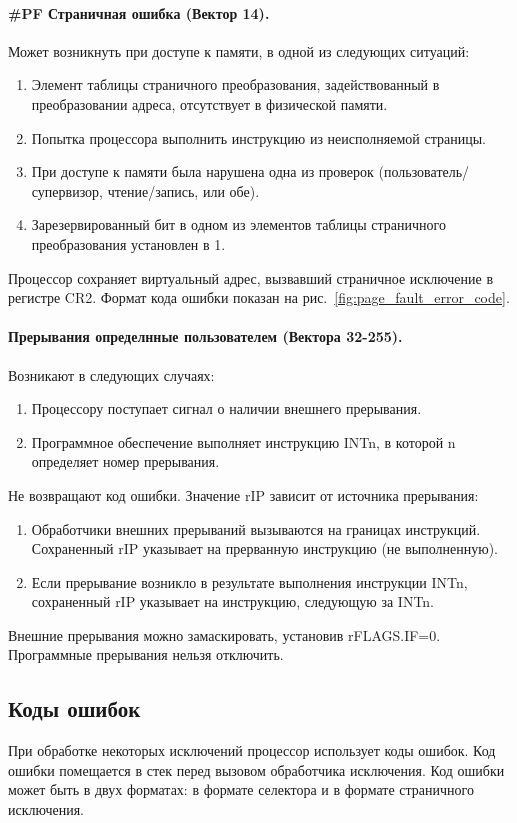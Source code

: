 \paragraph{\#PF Страничная ошибка (Вектор 14).}
Может возникнуть при доступе к памяти, в одной из следующих ситуаций:
\begin{enumerate}[1.]
\item Элемент таблицы страничного преобразования, задействованный в
преобразовании адреса, отсутствует в физической памяти.
\item Попытка процессора выполнить инструкцию из неисполняемой страницы.
\item При доступе к памяти была нарушена одна из проверок
(пользователь/супервизор, чтение/запись, или обе).
\item Зарезервированный бит в одном из элементов таблицы страничного
преобразования установлен в 1.
\end{enumerate}

Процессор сохраняет виртуальный адрес, вызвавший страничное
исключение в регистре CR2. Формат кода ошибки показан на
рис.~\ref{fig:page_fault_error_code}.

\paragraph{Прерывания определнные пользователем (Вектора 32-255).}
Возникают в следующих случаях:
\begin{enumerate}[1.]
\item Процессору поступает сигнал о наличии внешнего прерывания.
\item Программное обеспечение выполняет инструкцию INTn, в которой n
определяет номер прерывания.
\end{enumerate}

Не возвращают код ошибки. Значение rIP зависит от источника прерывания:
\begin{enumerate}[1.]
\item Обработчики внешних прерываний вызываются на границах инструкций. Сохраненный rIP
	указывает на прерванную инструкцию (не выполненную).
\item Если прерывание возникло в результате выполнения инструкции INTn,
сохраненный rIP указывает на инструкцию, следующую за INTn.
\end{enumerate}

Внешние прерывания можно замаскировать, установив rFLAGS.IF=0. Программные
прерывания нельзя отключить.

\subsection{Коды ошибок}
При обработке некоторых исключений процессор использует коды ошибок. Код
ошибки помещается в стек перед вызовом обработчика исключения. Код ошибки
может быть в двух форматах: в формате селектора и в формате страничного исключения.

